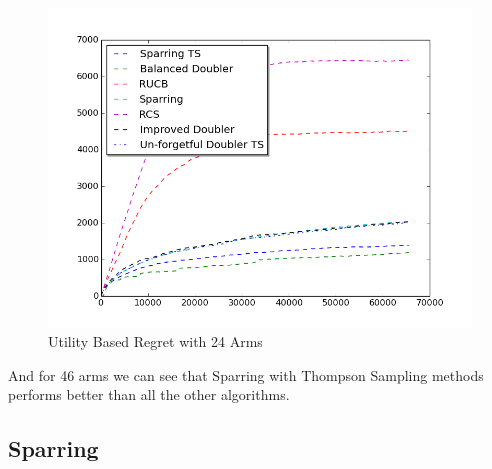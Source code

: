 \documentclass{llncs}
\begin{document}
\begin{figure}[h!]
\centering
  \includegraphics[scale=0.5, natwidth=610,natheight=642]{figures/all_MQ2007_24arms.png}
  \caption{Utility Based Regret with 24 Arms}
\end{figure}

And for 46 arms we can see that Sparring with Thompson Sampling methods performs better than all the other algorithms.


\subsection{Sparring}
\end{document}
